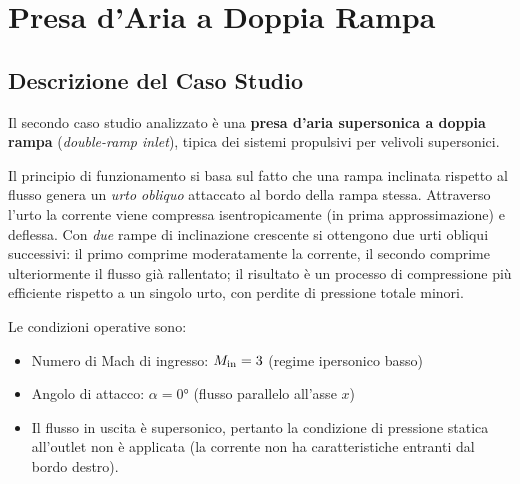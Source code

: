 \chapter{Presa d'Aria a Doppia Rampa}
\label{cap:doppia_presa}

\section{Descrizione del Caso Studio}
\label{sec:presa_descrizione}

Il secondo caso studio analizzato è una \textbf{presa d'aria supersonica a doppia rampa} (\textit{double-ramp inlet}), tipica dei sistemi propulsivi per velivoli supersonici.

Il principio di funzionamento si basa sul fatto che una rampa inclinata rispetto al flusso
genera un \emph{urto obliquo} attaccato al bordo della rampa stessa. Attraverso l'urto la
corrente viene compressa isentropicamente (in prima approssimazione) e deflessa.
Con \emph{due} rampe di inclinazione crescente si ottengono due urti obliqui successivi:
il primo comprime moderatamente la corrente, il secondo comprime ulteriormente il flusso già
rallentato; il risultato è un processo di compressione più efficiente rispetto a un singolo
urto, con perdite di pressione totale minori.

Le condizioni operative sono:
\begin{itemize}
  \item Numero di Mach di ingresso: $M_{\rm in} = 3$ (regime ipersonico basso)
  \item Angolo di attacco: $\alpha = 0°$ (flusso parallelo all'asse $x$)
  \item Il flusso in uscita è supersonico, pertanto la condizione di pressione statica
    all'outlet non è applicata (la corrente non ha caratteristiche entranti dal bordo destro).
\end{itemize}

